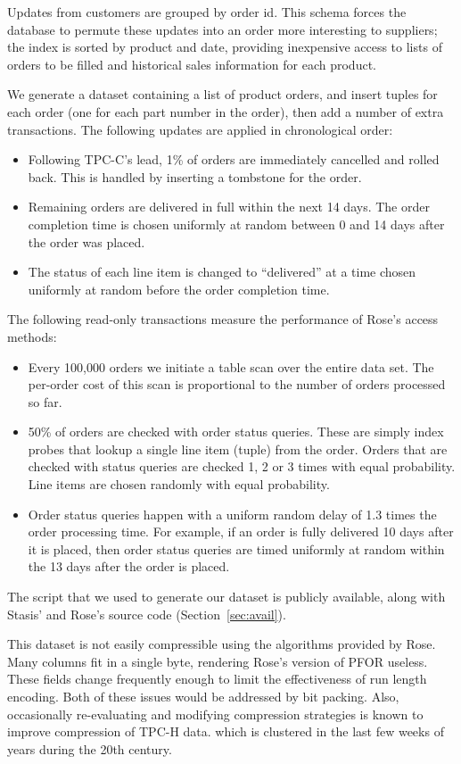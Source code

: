 \documentclass{vldb}
\newcommand{\rows}{Rose\xspace}
\newcommand{\rowss}{Rose's\xspace}
\newcommand{\xxx}[1]{\textcolor{red}{\bf XXX: #1}}
\renewcommand{\xxx}[1]{\xspace}
\begin{document}
Updates from customers are grouped by
order id.
This schema forces the database to permute these updates
into an order more interesting to suppliers; the index is sorted by
product and date, providing inexpensive access to lists of orders to
be filled and historical sales information for each product.

We generate a dataset containing a list of product orders, and insert
tuples for each order (one for each part number in the order), then
add a number of extra transactions.  The following updates are applied in chronological order:

\begin{itemize}
\item Following TPC-C's lead, 1\% of orders are immediately cancelled
  and rolled back.  This is handled by inserting a tombstone for the
  order.
\item Remaining orders are delivered in full within the next 14 days.
  The order completion time is chosen uniformly at random between 0
  and 14 days after the order was placed.
\item  The status of each line item is changed to ``delivered'' at a time
  chosen uniformly at random before the order completion time.
\end{itemize}
The following read-only transactions measure the performance of \rowss
access methods:
\begin{itemize}
\item Every 100,000 orders we initiate a table scan over the entire
  data set.  The per-order cost of this scan is proportional to the
  number of orders processed so far.
\item 50\% of orders are checked with order status queries.  These are
  simply index probes that lookup a single line item (tuple) from the
  order.  Orders that are checked with status queries are checked 1, 2
  or 3 times with equal probability.  Line items are chosen randomly
  with equal probability.
\item Order status queries happen with a uniform random delay of 1.3
  times the order processing time.  For example, if an order
  is fully delivered 10 days after it is placed, then order status queries are
  timed uniformly at random within the 13 days after the order is
  placed.
\end{itemize}
The script that we used to generate our dataset is publicly available,
along with Stasis' and \rowss source code (Section~\ref{sec:avail}).

This dataset is not easily compressible using the algorithms provided
by \rows.  Many columns fit in a single byte, rendering \rowss version
of PFOR useless.  These fields change frequently enough to limit the
effectiveness of run length encoding.  Both of these issues would be
addressed by bit packing.  Also, occasionally re-evaluating and modifying
compression strategies is known to improve compression of TPC-H data.
which is clustered in the last few weeks of years during the
20th century.\xxx{check}
\end{document}
